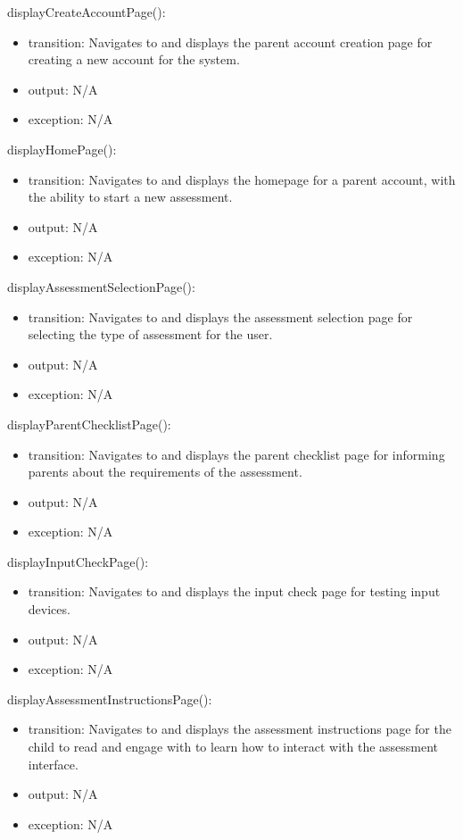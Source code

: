 \documentclass[12pt, titlepage]{article}
\begin{document}
\noindent displayCreateAccountPage():
\begin{itemize}
\item transition: Navigates to and displays the parent account creation page for creating a new account for the system.
\item output: N/A
\item exception: N/A
\end{itemize}

\noindent displayHomePage():
\begin{itemize}
\item transition: Navigates to and displays the homepage for a parent account, with the ability to start a new assessment.
\item output: N/A
\item exception: N/A
\end{itemize}

\noindent displayAssessmentSelectionPage():
\begin{itemize}
\item transition: Navigates to and displays the assessment selection page for selecting the type of assessment for the user.
\item output: N/A
\item exception: N/A
\end{itemize}

\noindent displayParentChecklistPage():
\begin{itemize}
\item transition: Navigates to and displays the parent checklist page for informing parents about the requirements of the assessment.
\item output: N/A
\item exception: N/A
\end{itemize}

\noindent displayInputCheckPage():
\begin{itemize}
\item transition: Navigates to and displays the input check page for testing input devices.
\item output: N/A
\item exception: N/A
\end{itemize}

\noindent displayAssessmentInstructionsPage():
\begin{itemize}
\item transition: Navigates to and displays the assessment instructions page for the child to read and engage with to learn how to interact with the assessment interface.
\item output: N/A
\item exception: N/A
\end{itemize}
\end{document}
